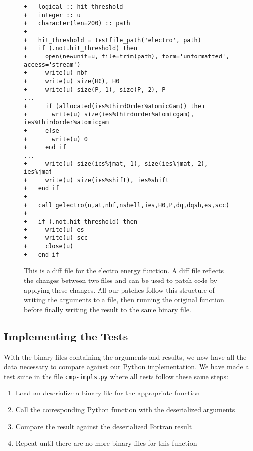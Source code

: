 \begin{figure}[H]
\begin{verbatim}
+   logical :: hit_threshold
+   integer :: u
+   character(len=200) :: path
+
+   hit_threshold = testfile_path('electro', path)
+   if (.not.hit_threshold) then
+     open(newunit=u, file=trim(path), form='unformatted', access='stream')
+     write(u) nbf
+     write(u) size(H0), H0
+     write(u) size(P, 1), size(P, 2), P
...
+     if (allocated(ies%thirdOrder%atomicGam)) then
+       write(u) size(ies%thirdorder%atomicgam), ies%thirdorder%atomicgam
+     else
+       write(u) 0
+     end if
...
+     write(u) size(ies%jmat, 1), size(ies%jmat, 2), ies%jmat
+     write(u) size(ies%shift), ies%shift
+   end if
+
+   call gelectro(n,at,nbf,nshell,ies,H0,P,dq,dqsh,es,scc)
+
+   if (.not.hit_threshold) then
+     write(u) es
+     write(u) scc
+     close(u)
+   end if
\end{verbatim}
\caption{This is a diff file for the electro energy function. A diff file reflects the changes between two files and can be used to patch code by applying these changes. All our patches follow this structure of writing the arguments to a file, then running the original function before finally writing the result to the same binary file.}
\label{fig:patchfile}
\end{figure}

\subsection{Implementing the Tests}

With the binary files containing the arguments and results, we now have all the data necessary to compare against our Python implementation. We have made a test suite in the file \verb|cmp-impls.py| where all tests follow these same steps:

\begin{enumerate}
   \item Load an deserialize a binary file for the appropriate function
   \item Call the corresponding Python function with the deserialized arguments
   \item Compare the result against the deserialized Fortran result
   \item Repeat until there are no more binary files for this function
\end{enumerate}


